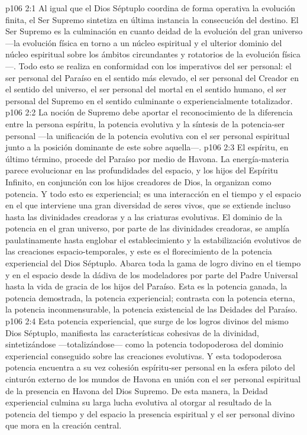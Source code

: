 \vs p106 2:1 Al igual que el Dios Séptuplo coordina de forma operativa la evolución finita, el Ser Supremo sintetiza en última instancia la consecución del destino. El Ser Supremo es la culminación en cuanto deidad de la evolución del gran universo ---la evolución física en torno a un núcleo espiritual y el ulterior dominio del núcleo espiritual sobre los ámbitos circundantes y rotatorios de la evolución física---. Todo esto se realiza en conformidad con los imperativos del ser personal: el ser personal del Paraíso en el sentido más elevado, el ser personal del Creador en el sentido del universo, el ser personal del mortal en el sentido humano, el ser personal del Supremo en el sentido culminante o experiencialmente totalizador.
\vs p106 2:2 \pc La noción de Supremo debe aportar el reconocimiento de la diferencia entre la persona espíritu, la potencia evolutiva y la síntesis de la potencia\hyp{}ser personal ---la unificación de la potencia evolutiva con el ser personal espiritual junto a la posición dominante de este sobre aquella---.
\vs p106 2:3 El espíritu, en último término, procede del Paraíso por medio de Havona. La energía\hyp{}materia parece evolucionar en las profundidades del espacio, y los hijos del Espíritu Infinito, en conjunción con los hijos creadores de Dios, la organizan como potencia. Y todo esto es experiencial; es una interacción en el tiempo y el espacio en el que interviene una gran diversidad de seres vivos, que se extiende incluso hasta las divinidades creadoras y a las criaturas evolutivas. El dominio de la potencia en el gran universo, por parte de las divinidades creadoras, se amplía paulatinamente hasta englobar el establecimiento y la estabilización evolutivos de las creaciones espacio\hyp{}temporales, y este es el florecimiento de la potencia experiencial del Dios Séptuplo. Abarca toda la gama de logro divino en el tiempo y en el espacio desde la dádiva de los modeladores por parte del Padre Universal hasta la vida de gracia de los hijos del Paraíso. Esta es la potencia ganada, la potencia demostrada, la potencia experiencial; contrasta con la potencia eterna, la potencia inconmensurable, la potencia existencial de las Deidades del Paraíso.
\vs p106 2:4 Esta potencia experiencial, que surge de los logros divinos del mismo Dios Séptuplo, manifiesta las características cohesivas de la divinidad, sintetizándose ---totalizándose--- como la potencia todopoderosa del dominio experiencial conseguido sobre las creaciones evolutivas. Y esta todopoderosa potencia encuentra a su vez cohesión espíritu\hyp{}ser personal en la esfera piloto del cinturón externo de los mundos de Havona en unión con el ser personal espiritual de la presencia en Havona del Dios Supremo. De esta manera, la Deidad experiencial culmina su larga lucha evolutiva al otorgar al resultado de la potencia del tiempo y del espacio la presencia espiritual y el ser personal divino que mora en la creación central.
